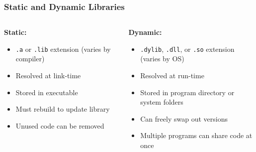 \documentclass[glossy]{beamer}
\begin{document}

\begin{frame}[fragile=singleslide]
  \frametitle{Static and Dynamic Libraries}
  \begin{columns}[t]
    \begin{column}{6cm}
      \textbf{Static:}
      \begin{itemize}
        \item \texttt{.a} or \texttt{.lib} extension (varies by compiler)
        \item Resolved at link-time
        \item Stored in executable
        \item Must rebuild to update library
        \item Unused code can be removed
      \end{itemize}
    \end{column}

    \begin{column}{6cm}
      \textbf{Dynamic:}
      \begin{itemize}
        \item \texttt{.dylib}, \texttt{.dll}, or \texttt{.so} extension (varies by OS)
        \item Resolved at run-time
        \item Stored in program directory or system folders
        \item Can freely swap out versions
        \item Multiple programs can share code at once
      \end{itemize}
    \end{column}
  \end{columns}
\end{frame}

\end{document}
